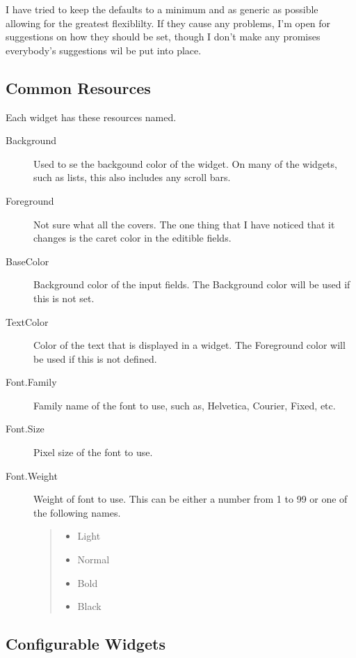 \documentclass[titlepage]{article}
\begin{document}
I have tried to keep the defaults to a minimum and as generic as possible
allowing for the greatest flexiblilty. If they cause any problems, I'm
open for suggestions on how they should be set, though I don't make
any promises everybody's suggestions wil be put into place.

\subsection{Common Resources}
Each widget has these resources named.
\begin{description}
\item[Background] Used to se the backgound color of the widget. On
many of the widgets, such as lists, this also includes any scroll bars.
\item[Foreground] Not sure what all the covers. The one thing that I
have noticed that it changes is the caret color in the editible
fields.
\item[BaseColor] Background color of the input fields. The Background
color will be used if this is not set.
\item[TextColor] Color of the text that is displayed in a widget. The
Foreground color will be used if this is not defined.
\item[Font.Family] Family name of the font to use, such as, Helvetica,
Courier, Fixed, etc.
\item[Font.Size] Pixel size of the font to use.
\item[Font.Weight] Weight of font to use. This can be either a number
from 1 to 99 or one of the following names.
\begin{quote}
\begin{itemize}
\item{Light}
\item{Normal}
\item{Bold}
\item{Black}
\end{itemize}
\end{quote}
\end{description}

\subsection{Configurable Widgets}
\end{document}
